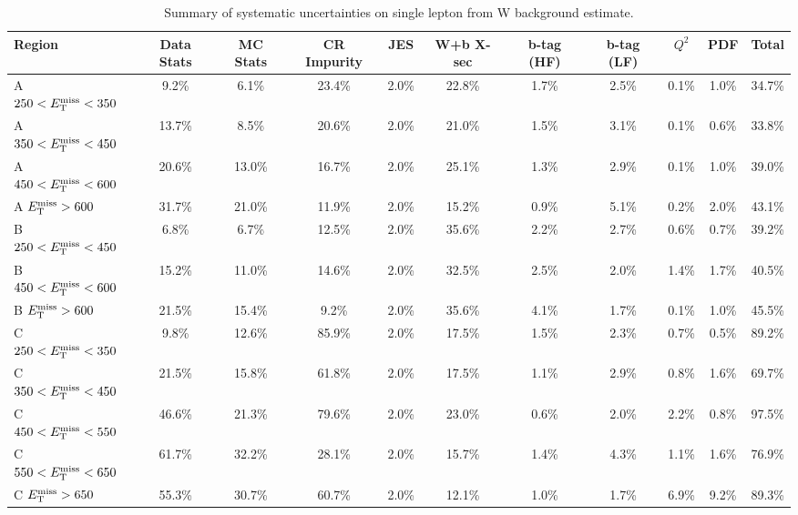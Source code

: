 \begin{table}
\centering
\small
\caption{Summary of systematic uncertainties on single lepton from W
  background estimate.}
\label{tab:stop:1lw:systematics}
\begin{tabular}{| l | c c | c c c c c c c | c |}
\hline
Region & Data Stats & MC Stats & CR Impurity & JES & W+b X-sec & b-tag (HF) & b-tag (LF) & $Q^2$ & PDF & Total \\
\hline
 A  $250 < E_\text{T}^\text{miss} < 350$  &   9.2\% &   6.1\% &  23.4\% &   2.0\% &  22.8\% &   1.7\% &   2.5\% &   0.1\% &   1.0\% &  34.7\% \\
 A  $350 < E_\text{T}^\text{miss} < 450$  &  13.7\% &   8.5\% &  20.6\% &   2.0\% &  21.0\% &   1.5\% &   3.1\% &   0.1\% &   0.6\% &  33.8\% \\
 A  $450 < E_\text{T}^\text{miss} < 600$  &  20.6\% &  13.0\% &  16.7\% &   2.0\% &  25.1\% &   1.3\% &   2.9\% &   0.1\% &   1.0\% &  39.0\% \\
 A  $E_\text{T}^\text{miss} >600$  &  31.7\% &  21.0\% &  11.9\% &   2.0\% &  15.2\% &   0.9\% &   5.1\% &   0.2\% &   2.0\% &  43.1\% \\
\hline
 B  $250 < E_\text{T}^\text{miss} < 450$  &   6.8\% &   6.7\% &  12.5\% &   2.0\% &  35.6\% &   2.2\% &   2.7\% &   0.6\% &   0.7\% &  39.2\% \\
 B  $450 < E_\text{T}^\text{miss} < 600$  &  15.2\% &  11.0\% &  14.6\% &   2.0\% &  32.5\% &   2.5\% &   2.0\% &   1.4\% &   1.7\% &  40.5\% \\
 B  $E_\text{T}^\text{miss} >600$  &  21.5\% &  15.4\% &   9.2\% &   2.0\% &  35.6\% &   4.1\% &   1.7\% &   0.1\% &   1.0\% &  45.5\% \\
\hline
 C  $250 < E_\text{T}^\text{miss} < 350$  &   9.8\% &  12.6\% &  85.9\% &   2.0\% &  17.5\% &   1.5\% &   2.3\% &   0.7\% &   0.5\% &  89.2\% \\
 C  $350 < E_\text{T}^\text{miss} < 450$  &  21.5\% &  15.8\% &  61.8\% &   2.0\% &  17.5\% &   1.1\% &   2.9\% &   0.8\% &   1.6\% &  69.7\% \\
 C  $450 < E_\text{T}^\text{miss} < 550$  &  46.6\% &  21.3\% &  79.6\% &   2.0\% &  23.0\% &   0.6\% &   2.0\% &   2.2\% &   0.8\% &  97.5\% \\
 C  $550 < E_\text{T}^\text{miss} < 650$  &  61.7\% &  32.2\% &  28.1\% &   2.0\% &  15.7\% &   1.4\% &   4.3\% &   1.1\% &   1.6\% &  76.9\% \\
 C  $E_\text{T}^\text{miss} >650$  &  55.3\% &  30.7\% &  60.7\% &   2.0\% &  12.1\% &   1.0\% &   1.7\% &   6.9\% &   9.2\% &  89.3\% \\

\end{tabular}
\end{table}
